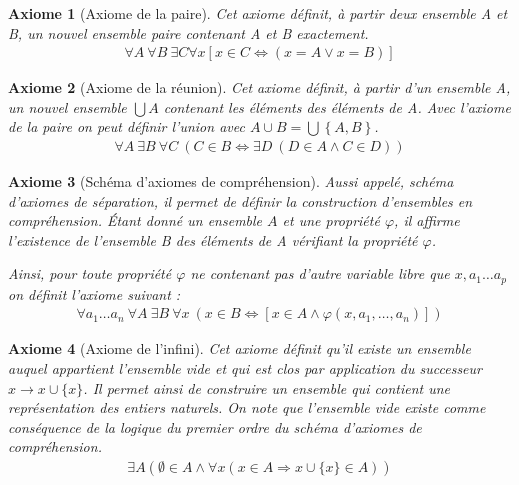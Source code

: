 \documentclass[10pt,a4paper]{article}
\newtheorem{axiom}{Axiome}[section]
\begin{document}
\begin{axiom}[Axiome de la paire] Cet axiome définit, à partir deux ensemble A et B, un nouvel ensemble paire contenant A et B exactement.
\begin{align}
\forall A \ \forall B \ \exists C \forall x \left[ x \in C \Leftrightarrow \left( x = A \vee x = B \right) \right]
\end{align}
\end{axiom}

\begin{axiom}[Axiome de la réunion] Cet axiome définit, à partir d'un ensemble A, un nouvel ensemble $\bigcup A$ contenant les éléments des éléments de A. Avec l'axiome de la paire on peut définir l'union avec $A \cup B = \bigcup \left\{A, B\right\}$.
\begin{align}
\forall A\ \exists B\ \forall C\ \left( C\in B \Leftrightarrow \exists D\ \left( D\in A \wedge C\in D \right) \right)
\end{align}
\end{axiom}


\begin{axiom}[Schéma d'axiomes de compréhension] Aussi appelé, schéma d'axiomes de séparation, il permet de définir la construction d'ensembles en compréhension. Étant donné un ensemble $A$ et une propriété $\varphi$, il affirme l'existence de l'ensemble B des éléments de A vérifiant la propriété $\varphi$.

Ainsi, pour toute propriété $\varphi$ ne contenant pas d'autre variable libre que $x, a_1 \ldots a_p$ on définit l'axiome suivant :
\begin{align}
\forall a_1 \ldots a_n \ \forall A \ \exists B \ \forall x \ \left( x \in B \Leftrightarrow \left[ x \in A \wedge \varphi \left(x, a_1, \ldots, a_n \right) \right] \right) 
\end{align}
\end{axiom}

\begin{axiom}[Axiome de l'infini] Cet axiome définit qu'il existe un ensemble auquel appartient l'ensemble vide et qui est clos par application du successeur$ x \rightarrow x \cup \{x\}$. Il permet ainsi de construire un ensemble qui contient une représentation des entiers naturels. On note que l'ensemble vide existe comme conséquence de la logique du premier ordre du schéma d'axiomes de compréhension.
\begin{align}
\exists A \left( \emptyset \in A \land \forall x (x \in A \Rightarrow x \cup \{x\} \in A) \right) 
\end{align}
\end{axiom}
\end{document}
